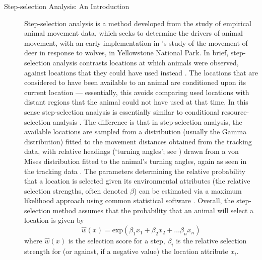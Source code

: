 \begin{tcolorbox}[width=\textwidth,
    boxsep=0pt,
    left=0pt,
    right=0pt,
    top=2pt,
    arc=0pt,
    boxrule=0.0pt,
    toprule=1pt,
    bottomrule=1pt,
    colback=white
    ]%
    \begin{description}
        \item[Step-selection Analysis: An Introduction] Step-selection analysis is a method developed from the study of empirical animal movement data, which seeks to determine the drivers of animal movement, with an early implementation in \textcite{fortin2005}'s study of the movement of deer in response to wolves, in Yellowstone National Park.
        In brief, step-selection analysis contrasts locations at which animals were observed, against locations that they could have used instead \parencite[][]{fortin2005}.
        The locations that are considered to have been available to an animal are conditioned upon its current location --- essentially, this avoids comparing used locations with distant regions that the animal could not have used at that time.
        In this sense step-selection analysis is essentially similar to conditional resource-selection analysis \parencite[see as general reference][]{manly2007}.
        The difference is that in step-selection analysis, the available locations are sampled from a distribution (usually the Gamma distribution) fitted to the movement distances obtained from the tracking data, with relative headings (`turning angles'; see \cite{calenge2009}) drawn from a von Mises distribution fitted to the animal's turning angles, again as seen in the tracking data \parencite[][]{thurfjell2014,signer2019}.
        The parameters determining the relative probability that a location is selected given its environmental attributes (the relative selection strengths, often denoted $\beta$) can be estimated via a maximum likelihood approach using common statistical software \parencite[see e.g. for R][]{therneau2000}.
        Overall, the step-selection method assumes that the probability that an animal will select a location is given by
        $$
            \hat{w}(x) = \text{exp}(\beta_1x_1 + \beta_2x_2 + \ldots \beta_nx_n)
        $$
        where $\hat{w}(x)$ is the selection score for a step, $\beta_i$ is the relative selection strength for (or against, if a negative value) the location attribute $x_i$.
    \end{description}
\end{tcolorbox}

